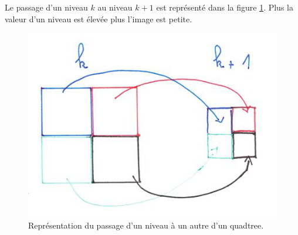 Le passage d'un niveau $k$ au niveau $k + 1$ est représenté dans la figure \ref{fig:quadtree-niveaux}. Plus la valeur d'un niveau est élevée plus l'image est petite.

\begin{figure}[H]
	\centering
	\includegraphics[scale=0.6]{images/quadtree-niveaux.jpg}
	\caption{Représentation du passage d'un niveau à un autre d'un quadtree.}
	\label{fig:quadtree-niveaux}
\end{figure}